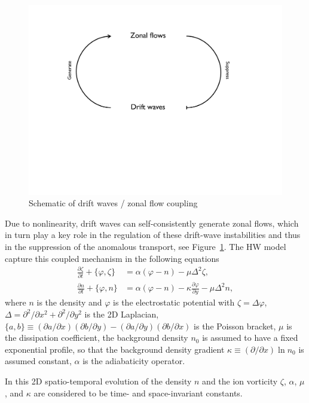 \documentclass[12pt,lot, lof]{puthesis}
\begin{document}
\begin{figure}[htbp]
\centering
\includegraphics [width=0.7\linewidth]{rel} 
\caption{Schematic of drift waves / zonal flow coupling}
\label{rel}
\end{figure}

Due to nonlinearity, drift waves can self-consistently generate zonal flows, which in turn play a key role in the regulation of these drift-wave instabilities and thus in the suppression of the anomalous transport, see Figure~{\ref{rel}}. The HW model \cite{Hasegawa1,Hasegawa2} capture this coupled mechanism in the following equations
\begin{subequations}
\label{HW1}
\begin{align}
	\frac{\partial \zeta}{\partial t}  + \{\varphi , \zeta \} &= \alpha ({\varphi}-{n}) - \mu \Delta^2 \zeta \label{MHWeqs1}	, \\	
	\frac{\partial n}{\partial t}  + \{\varphi , n\} &=  \alpha ({\varphi}-{n}) -\kappa \frac{\partial \varphi}{\partial y}- \mu \Delta^2 n,
\label{HW2}	
\end{align}
\end{subequations}
where $n$ is the density and $\varphi$ is the electrostatic potential with $\zeta = \Delta \varphi$, $\Delta = \partial ^2 / \partial x^2+ \partial ^2 / \partial y^2$ is the 2D Laplacian, $\{a,b\} \equiv  \left( \partial a /\partial x  \right)\left( \partial b /\partial y \right)  -\left( \partial a /\partial y  \right)\left( \partial b /\partial x \right) $ is the Poisson bracket, $\mu$ is the dissipation coefficient, the background density $n_0$ is assumed to have a fixed exponential profile, so that the background density gradient  $\kappa \equiv  \left( \partial  /\partial x \right) \ln n_0$ is assumed constant, $\alpha $ is the adiabaticity operator.

In this 2D spatio-temporal evolution of the density $n$ and the ion vorticity $\zeta$, $\alpha$, $\mu$, and $\kappa$ are considered to be time- and space-invariant constants.
\end{document}
